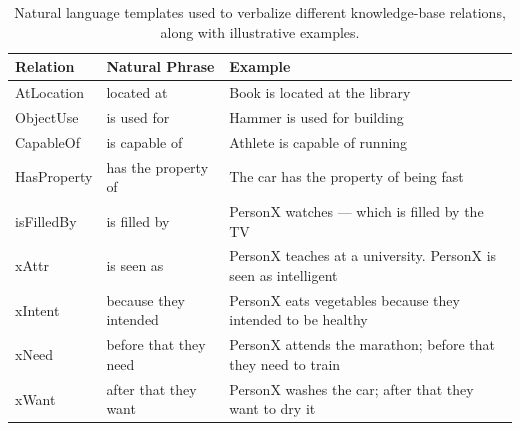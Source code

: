 \documentclass{i4c-en}
\begin{document}
\begin{table}[htbp]
	\centering
	\scriptsize
	\begin{tabular}{lll}
		\toprule
		\textbf{Relation} & \textbf{Natural Phrase} & \textbf{Example} \\
		\midrule
		AtLocation & located at & Book is located at the library \\
		ObjectUse & is used for & Hammer is used for building \\
		CapableOf & is capable of & Athlete is capable of running \\
		HasProperty & has the property of & The car has the property of being fast \\
		isFilledBy & is filled by & PersonX watches --- which is filled by the TV \\
		xAttr & is seen as & PersonX teaches at a university. PersonX is seen as intelligent \\     
		\midrule
		xIntent & because they intended & PersonX eats vegetables because they intended to be healthy \\
		xNeed & before that they need & PersonX attends the marathon; before that they need to train \\
		xWant & after that they want & PersonX washes the car; after that they want to dry it \\
		\bottomrule
	\end{tabular}
	\caption{Natural language templates used to verbalize different knowledge-base relations, along with illustrative examples.}
	\label{table:tuples}
\end{table}

	
\end{document}
